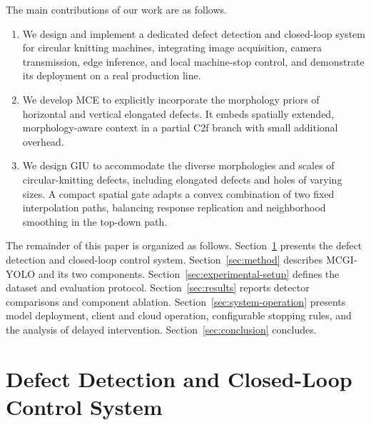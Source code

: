 \documentclass[journal]{IEEEtranTIE}
\begin{document}
The main contributions of our work are as follows.
\begin{enumerate}
  \renewcommand{\labelenumi}{\arabic{enumi})}
  \item We design and implement a dedicated defect detection and closed-loop system for circular knitting machines, integrating image acquisition, camera transmission, edge inference, and local machine-stop control, and demonstrate its deployment on a real production line.
  \item We develop MCE to explicitly incorporate the morphology priors of horizontal and vertical elongated defects. It embeds spatially extended, morphology-aware context in a partial C2f branch with small additional overhead.
  \item We design GIU to accommodate the diverse morphologies and scales of circular-knitting defects, including elongated defects and holes of varying sizes. A compact spatial gate adapts a convex combination of two fixed interpolation paths, balancing response replication and neighborhood smoothing in the top-down path.
\end{enumerate}

The remainder of this paper is organized as follows. Section~\ref{sec:system-design} presents the defect detection and closed-loop control system. Section~\ref{sec:method} describes MCGI-YOLO and its two components. Section~\ref{sec:experimental-setup} defines the dataset and evaluation protocol. Section~\ref{sec:results} reports detector comparisons and component ablation. Section~\ref{sec:system-operation} presents model deployment, client and cloud operation, configurable stopping rules, and the analysis of delayed intervention. Section~\ref{sec:conclusion} concludes.

\section{Defect Detection and Closed-Loop Control System}
\label{sec:system-design}
\end{document}
